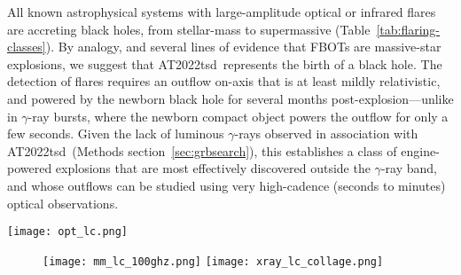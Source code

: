 \documentclass{nature_plusfigure}
\newcommand{\at}{AT2022tsd}
\begin{document}
All known astrophysical systems with large-amplitude optical or infrared flares are accreting black holes, from stellar-mass to supermassive (Table~\ref{tab:flaring-classes}). By analogy, and several lines of evidence that FBOTs are massive-star explosions, we suggest that \at\ represents the birth of a black hole.
The detection of flares requires an outflow on-axis that is at least mildly relativistic, and powered by the newborn black hole for several months post-explosion---unlike in $\gamma$-ray bursts, where the newborn compact object powers the outflow for only a few seconds. Given the lack of luminous $\gamma$-rays observed in association with \at\ (Methods section~\ref{sec:grbsearch}), this establishes a class of engine-powered explosions that are most effectively discovered outside the $\gamma$-ray band, and whose outflows can be studied using very high-cadence (seconds to minutes) optical observations.

\newpage

\begin{figure*}
\centering
    \texttt{[image: opt\_lc.png]}
\caption{\textbf{\at\ optical light curve.}
    The original transient event ($\Delta t_\mathrm{obs}<28\,$d) was identified on the basis of its blue peak colors, fast photometric evolution, and high peak luminosity. At $\Delta t\approx100\,$d, a bright minute-timescale flare was detected with Magellan/IMACS. Forced photometry on ZTF and Pan-STARRS images revealed additional flare detections prior to the IMACS observation. Measurements have been corrected for Milky Way extinction, and error bars are 1-$\sigma$. Upper limits (3-$\sigma$) are shown as open triangles. A crude cosmological correction has been applied to convert to absolute magnitude. Epochs of follow-up observations (optical spectroscopy, X-ray, and radio) are marked. }
 \label{fig:optical-lc}
\end{figure*}

\begin{figure*}
\centering
    \begin{subfigure}[t]{1.0\textwidth}
         \centering
         \texttt{[image: mm\_lc\_100ghz.png]}
        \texttt{[image: xray\_lc\_collage.png]}
     \end{subfigure}
\caption{\textbf{Millimeter (left) and X-ray (right) light curves of \at} and other radio-loud luminous fast blue optical transients (LFBOTs) compared to different classes of extragalactic transients: tidal disruption events (TDEs), long-duration gamma-ray bursts (LGRBs), low-luminosity GRBs (LLGRBs), and core-collapse supernovae (CC SNe). The millimeter and X-ray luminosity of LFBOTs resembles relativistic explosions such as LGRBs, and \at\ has the most luminous X-ray emission of any LFBOT to date. The millimeter points for AT2022tsd, and the X-ray points for AT2022tsd and FBOT AT2020xnd, are outlined in black for clarity.}
 \label{fig:mm-xray-lc}
\end{figure*}
\end{document}
